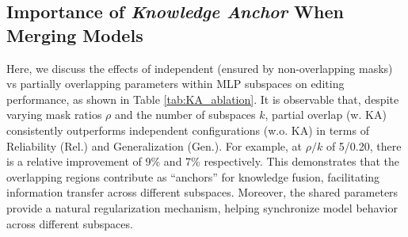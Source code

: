 \subsection{Importance of \textit{Knowledge Anchor} When Merging Models}\label{app_subsec:knowledge_anchor}

\begin{table}
    \centering
    \vspace{-0.5cm}
    \caption{\small Analysis of Merging \textit{w.o.} and \textit{w.} "knowledge anchor" (KA). $T=1000$. ZsRE. \texttt{LLaMA-2-7B}.}
    \label{tab:KA_ablation}
    \vspace{-0.4cm}
\end{table}

Here, we discuss the effects of independent (ensured by non-overlapping masks) vs partially overlapping parameters within MLP subspaces on editing performance, as shown in Table \ref{tab:KA_ablation}.
It is observable that, despite varying mask ratios \(\rho\) and the number of subspaces \(k\), partial overlap (w. KA) consistently outperforms independent configurations (w.o. KA) in terms of Reliability (Rel.) and Generalization (Gen.). 
For example, at \(\rho/k\) of 5/0.20, there is a relative improvement of 9\% and 7\% respectively.
This demonstrates that the overlapping regions contribute as ``anchors'' for knowledge fusion, facilitating information transfer across different subspaces.
Moreover, the shared parameters provide a natural regularization \cite{subspace_reg} mechanism, helping synchronize model behavior across different subspaces.

